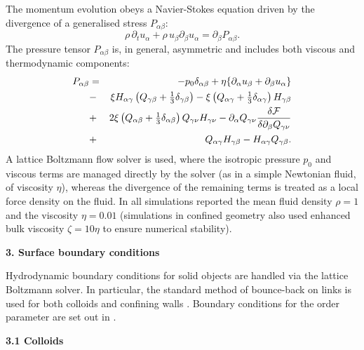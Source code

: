 \documentclass[12pt,twoside]{article}
\begin{document}
The momentum evolution obeys a Navier-Stokes equation driven by the divergence
of a generalised stress $P_{\alpha\beta}$:
\begin{equation}
\label{nse}
\rho\,\partial_tu_\alpha +\rho \,u_\beta \partial_\beta u_\alpha
=\partial_\beta P_{\alpha\beta}.
\end{equation}
The pressure tensor $P_{\alpha\beta}$ is, in general, asymmetric and includes
both viscous and thermodynamic components:
\begin{eqnarray}
P_{\alpha \beta}&=&
- p_0 \delta_{\alpha \beta} 
+ \eta \{ \partial_\alpha u_\beta + \partial_\beta u_\alpha\}
\nonumber\\
&-&  \xi H_{\alpha \gamma}\left(Q_{\gamma \beta}
+ {\textstyle \frac{1}{3}} \delta_{\gamma \beta} \right)
-\xi \left(Q_{\alpha \gamma}
+ { \textstyle \frac{1}{3}} \delta_{\alpha \gamma}\right) H_{\gamma \beta}
\nonumber\\ 
&+& 2 \xi  \left(Q_{\alpha \beta}
+ {\textstyle \frac{1}{3}} \delta_{\alpha \beta}\right) Q_{\gamma \nu} H_{\gamma \nu}
-\partial_\alpha Q_{\gamma \nu}
\frac{\delta{\cal F}}{\delta \partial_{\beta} Q_{\gamma \nu}}\nonumber\\
&+& Q_{\alpha \gamma}H_{\gamma \beta}-H_{\alpha \gamma} Q_{\gamma \beta}.
\end{eqnarray}
A lattice Boltzmann flow solver is used, where the isotropic pressure $p_0$
and viscous terms are managed directly by the solver (as in a simple Newtonian
fluid, of viscosity $\eta$), whereas the divergence of the remaining terms
is treated as a local force density on the fluid. In all simulations
reported the mean fluid density $\rho = 1$ and the viscosity
$\eta = 0.01$ (simulations in confined geometry also used enhanced
bulk viscosity $\zeta = 10\eta$ to ensure numerical stability).


{\bf 3. Surface boundary conditions}

Hydrodynamic boundary conditions for solid objects are handled via
the lattice Boltzmann solver. In particular, the standard method of
bounce-back on links is used for both colloids and confining walls
\cite{ladd94,nguyen2002}. Boundary conditions for the order parameter
are set out in \cite{juho}.

{\bf 3.1 Colloids}
\end{document}
